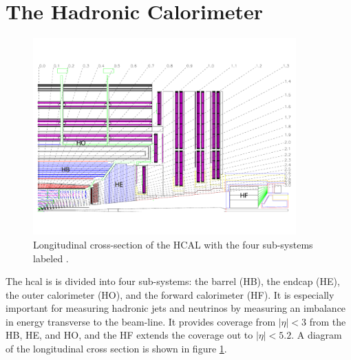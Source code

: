 \section{The Hadronic Calorimeter}
\label{hcal_description}

\begin{figure}[h]
   \centering
  \includegraphics[width=0.9\textwidth]{Figures/CMS_Diagrams/HCAL__Layout.pdf}
  \caption{Longitudinal cross-section of the HCAL with the four
    sub-systems labeled \cite{CMS:CMS_Machine_Chatrchyan:2008aa}. } \label{fig:hcal_layout}
\end{figure}

\par The \acrfull{hcal} is is divided into four sub-systems: the
barrel (HB), the endcap (HE), the outer calorimeter (HO), and the
forward calorimeter (HF).   It is especially important for measuring
hadronic jets and neutrinos by measuring an imbalance in energy
transverse to the beam-line.  It provides coverage from $|\eta|<3$ from
the HB, HE, and HO, and the HF extends the coverage out to
$|\eta|<5.2$.  A diagram of the longitudinal cross
section is shown in figure \ref{fig:hcal_layout}.

